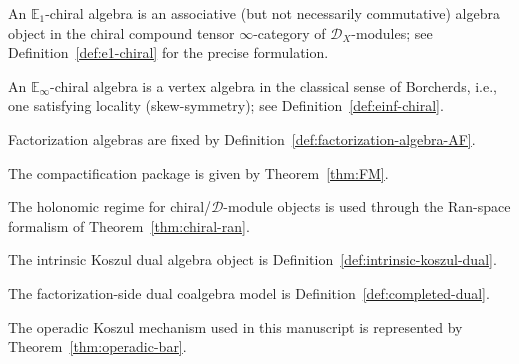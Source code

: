 \begin{definition}\label{def:e1-chiral-algebra}
An \(\mathbb{E}_1\)-chiral algebra is an associative (but not necessarily commutative)
algebra object in the chiral compound tensor \(\infty\)-category of \(\mathcal{D}_X\)-modules;
see Definition~\ref{def:e1-chiral} for the precise formulation.
\end{definition}

\begin{definition}\label{def:einf-chiral-algebra}
An \(\mathbb{E}_\infty\)-chiral algebra is a vertex algebra in the classical sense of Borcherds,
i.e., one satisfying locality (skew-symmetry); see Definition~\ref{def:einf-chiral}.
\end{definition}

\begin{definition}\label{def:factorization-algebra}
Factorization algebras are fixed by Definition~\ref{def:factorization-algebra-AF}.
\end{definition}

\begin{definition}\label{def:fm-compactification}
The compactification package is given by Theorem~\ref{thm:FM}.
\end{definition}

\begin{definition}\label{def:holonomic}
The holonomic regime for chiral/\(\mathcal{D}\)-module objects is used through the Ran-space formalism of Theorem~\ref{thm:chiral-ran}.
\end{definition}

\begin{definition}\label{def:koszul-dual-alg}
The intrinsic Koszul dual algebra object is Definition~\ref{def:intrinsic-koszul-dual}.
\end{definition}

\begin{definition}\label{def:koszul-dual-coalgebra-fact}
The factorization-side dual coalgebra model is Definition~\ref{def:completed-dual}.
\end{definition}

\begin{definition}\label{def:koszul-operad-index}
The operadic Koszul mechanism used in this manuscript is represented by Theorem~\ref{thm:operadic-bar}.
\end{definition}

